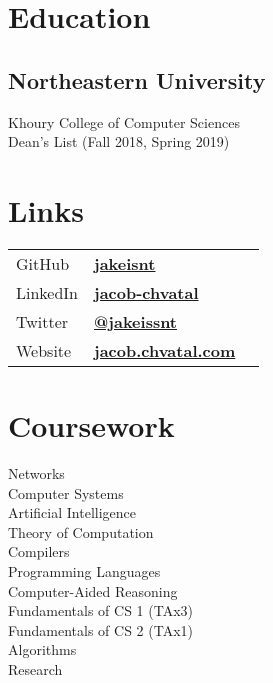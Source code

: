 \documentclass[letterpaper]{cv} %
\begin{document}
\begin{minipage}[t]{0.33\textwidth} %

  \section{Education}
  \subsection{Northeastern University}
  Khoury College of Computer Sciences \\
  Dean's List (Fall 2018, Spring 2019) \\
  \sectionspace %

  \section{Links}
  \begin{tabular}[t]{lll}
  GitHub &\href{https://github.com/jakeisnt}{\bf jakeisnt} \\
  LinkedIn &\href{https://www.linkedin.com/in/jacob-chvatal}{\bf jacob-chvatal} \\
  Twitter &\href{https://twitter.com/jakeissnt}{\bf @jakeissnt} \\
  Website &\href{https://jacob.chvatal.com}{\bf jacob.chvatal.com} \\
  \end{tabular}
  \sectionspace

  \section{Coursework}
  Networks \\
  Computer Systems \\
  Artificial Intelligence \\
  Theory of Computation \\
  Compilers \\
  Programming Languages \\
  Computer-Aided Reasoning \\
  Fundamentals of CS 1 (TAx3) \\
  Fundamentals of CS 2 (TAx1) \\
  Algorithms \\
  Research


\end{minipage}
\end{document}

